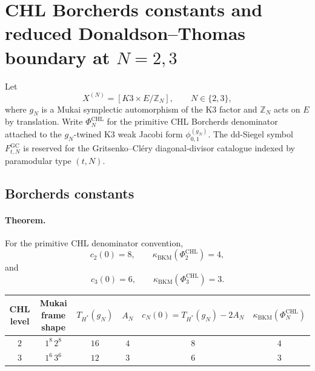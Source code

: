 \providecommand{\Z}{\mathbb{Z}}
\providecommand{\cO}{\mathcal{O}}
\providecommand{\PhiCHL}{\Phi^{\mathrm{CHL}}}
\providecommand{\FCHL}{F^{\mathrm{CHL}}}
\providecommand{\Fgc}{F^{\mathrm{GC}}}
\providecommand{\ZredDT}{Z^{\mathrm{red}}_{\mathrm{DT}}}
\providecommand{\kBKM}{\kappa_{\mathrm{BKM}}}
\providecommand{\kch}{\kappa_{\mathrm{ch}}}
\providecommand{\kcat}{\kappa_{\mathrm{cat}}}
\providecommand{\kfib}{\kappa_{\mathrm{fiber}}}

\section*{CHL Borcherds constants and reduced Donaldson--Thomas boundary at
\texorpdfstring{$N=2,3$}{N=2,3}}
\label{sec:chl-n23-borcherds-dt-boundary}

Let
\[
  X^{(N)}=[K3\times E/\Z_N], \qquad N\in\{2,3\},
\]
where \(g_N\) is a Mukai symplectic automorphism of the K3 factor and
\(\Z_N\) acts on \(E\) by translation.  Write \(\PhiCHL_N\) for the
primitive CHL Borcherds denominator attached to the \(g_N\)-twined
K3 weak Jacobi form \(\phi^{(g_N)}_{0,1}\).  The dd-Siegel symbol
\(\Fgc_{t,N}\) is reserved for the Gritsenko--Cl\'ery diagonal-divisor
catalogue indexed by paramodular type \((t,N)\).

\subsection*{Borcherds constants}

\paragraph{Theorem.}
For the primitive CHL denominator convention,
\[
  c_2(0)=8,\qquad \kBKM(\PhiCHL_2)=4,
\]
and
\[
  c_3(0)=6,\qquad \kBKM(\PhiCHL_3)=3.
\]

\begin{center}
\small
\begin{tabular}{c|c|c|c|c|c}
\hline
CHL level & Mukai frame shape & \(T_{H^*}(g_N)\) & \(A_N\) &
\(c_N(0)=T_{H^*}(g_N)-2A_N\) & \(\kBKM(\PhiCHL_N)\) \\
\hline
\(2\) & \(1^8\,2^8\) & \(16\) & \(4\) & \(8\) & \(4\) \\
\(3\) & \(1^6\,3^6\) & \(12\) & \(3\) & \(6\) & \(3\) \\
\hline
\end{tabular}
\end{center}

